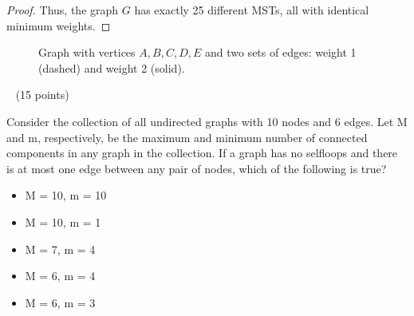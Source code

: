 \documentclass[12pt]{article}
\theoremstyle{plain}
\newcommand{\vs}{\vspace{2mm}}
\begin{document}
\begin{itemize}
\begin{proof}
        Thus, the graph $G$ has exactly 25 different MSTs, all with identical minimum weights.
    \end{proof}
    
    \begin{figure}[h!]
    \centering
    \caption{Graph with vertices $A, B, C, D, E$ and two sets of edges: weight 1 (dashed) and weight 2 (solid).}
    \end{figure}
\end{itemize}
\vs\
\newpage
{}(15 points)
\vs\

Consider the collection of all undirected graphs with 10 nodes and 6 edges. Let M and m, respectively, be the maximum and minimum number of connected components in any graph in the collection. If a graph has no selfloops and there is at most one edge between any pair of nodes, which of the following is true? 

\begin{itemize}
    \item[(A)] M = 10, m = 10
    \item[(B)] M = 10, m = 1
    \item[(C)] M = 7, m = 4
    \item[(D)] M = 6, m = 4
    \item[(E)] M = 6, m = 3
\end{itemize}
\end{document}
